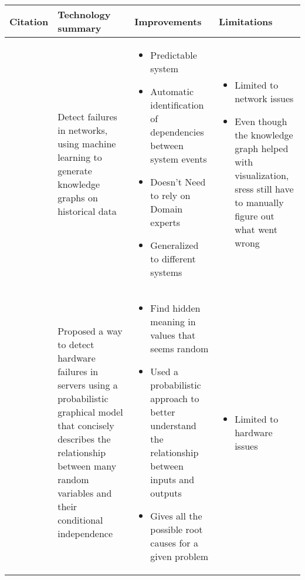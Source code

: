 \begin{longtable}{| p{20mm} | p{40mm} | p{43mm} | p{46mm} |}
\hline
  \textbf{Citation} &
  \textbf{Technology summary} &
  \textbf{Improvements} &
  \textbf{Limitations} \\ \hline
  \cite{gonzalez2017root} &
  Detect failures in networks, using machine learning to generate knowledge graphs on historical data &
  \vspace{-8mm}
  \begin{itemize}[leftmargin=*,noitemsep,nolistsep] 
    \item Predictable system
    \item Automatic identification of dependencies between system events
    \item Doesn't Need to rely on Domain experts
    \item Generalized to different systems
  \vspace{-7mm}
  \end{itemize} &
  \vspace{-8mm}
  \begin{itemize}[leftmargin=*,noitemsep,nolistsep] 
    \item Limited to network issues
    \item Even though the knowledge graph helped with visualization, \acp{sres} still have to manually figure out what went wrong
  \vspace{-7mm}
  \end{itemize} \\ \hline
  \cite{chigurupati2017root} &
  Proposed a way to detect hardware failures in servers using a probabilistic graphical model that concisely describes the relationship between many random variables and their conditional independence &
  \vspace{-8mm}
  \begin{itemize}[leftmargin=*,noitemsep,nolistsep] 
    \item Find hidden meaning in values that seems random
    \item Used a probabilistic approach to better understand the relationship between inputs and outputs
    \item Gives all the possible root causes for a given problem
  \vspace{-7mm}
  \end{itemize} &
  \vspace{-8mm}
  \begin{itemize}[leftmargin=*,noitemsep,nolistsep] 
    \item Limited to hardware issues

\end{itemize}
\end{longtable}
